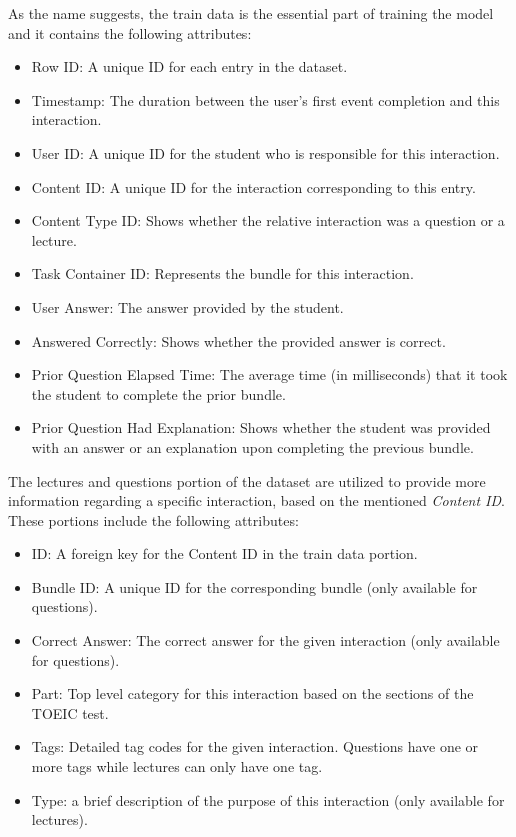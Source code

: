 \documentclass{article}
\begin{document}
As the name suggests, the train data is the essential part of training the model and it contains the following attributes:
\begin{itemize}
    \item Row ID: A unique ID for each entry in the dataset.
    \item Timestamp: The duration between the user's first event completion and this interaction.
    \item User ID: A unique ID for the student who is responsible for this interaction.
    \item Content ID: A unique ID for the interaction corresponding to this entry.
    \item Content Type ID: Shows whether the relative interaction was a question or a lecture.
    \item Task Container ID: Represents the bundle for this interaction.
    \item User Answer: The answer provided by the student.
    \item Answered Correctly: Shows whether the provided answer is correct.
    \item Prior Question Elapsed Time: The average time (in milliseconds) that it took the student to complete the prior bundle.
    \item Prior Question Had Explanation: Shows whether the student was provided with an answer or an explanation upon completing the previous bundle.
\end{itemize}

The lectures and questions portion of the dataset are utilized to provide more information regarding a specific interaction, based on the mentioned \emph{Content ID}. These portions include the following attributes:
\begin{itemize}
    \item ID: A foreign key for the Content ID in the train data portion.
    \item Bundle ID: A unique ID for the corresponding bundle (only available for questions).
    \item Correct Answer: The correct answer for the given interaction (only available for questions).
    \item Part: Top level category for this interaction based on the sections of the TOEIC test.
    \item Tags: Detailed tag codes for the given interaction. Questions have one or more tags while lectures can only have one tag.
    \item Type: a brief description of the purpose of this interaction (only available for lectures).
\end{itemize}
\end{document}
